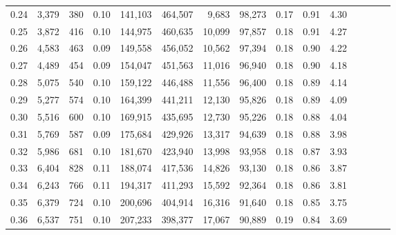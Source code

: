 \begin{tabular}{rrrcrrrrrrrrrrr}
0.24 &   3,379 &     380 &                                       0.10 &  141,103 &  464,507 &    9,683 &   98,273 &  0.17 &  0.91 &                         4.30 \\
0.25 &   3,872 &     416 &                                       0.10 &  144,975 &  460,635 &   10,099 &   97,857 &  0.18 &  0.91 &                         4.27 \\
0.26 &   4,583 &     463 &                                       0.09 &  149,558 &  456,052 &   10,562 &   97,394 &  0.18 &  0.90 &                         4.22 \\
0.27 &   4,489 &     454 &                                       0.09 &  154,047 &  451,563 &   11,016 &   96,940 &  0.18 &  0.90 &                         4.18 \\
0.28 &   5,075 &     540 &                                       0.10 &  159,122 &  446,488 &   11,556 &   96,400 &  0.18 &  0.89 &                         4.14 \\
0.29 &   5,277 &     574 &                                       0.10 &  164,399 &  441,211 &   12,130 &   95,826 &  0.18 &  0.89 &                         4.09 \\
0.30 &   5,516 &     600 &                                       0.10 &  169,915 &  435,695 &   12,730 &   95,226 &  0.18 &  0.88 &                         4.04 \\
0.31 &   5,769 &     587 &                                       0.09 &  175,684 &  429,926 &   13,317 &   94,639 &  0.18 &  0.88 &                         3.98 \\
0.32 &   5,986 &     681 &                                       0.10 &  181,670 &  423,940 &   13,998 &   93,958 &  0.18 &  0.87 &                         3.93 \\
0.33 &   6,404 &     828 &                                       0.11 &  188,074 &  417,536 &   14,826 &   93,130 &  0.18 &  0.86 &                         3.87 \\
0.34 &   6,243 &     766 &                                       0.11 &  194,317 &  411,293 &   15,592 &   92,364 &  0.18 &  0.86 &                         3.81 \\
0.35 &   6,379 &     724 &                                       0.10 &  200,696 &  404,914 &   16,316 &   91,640 &  0.18 &  0.85 &                         3.75 \\
0.36 &   6,537 &     751 &                                       0.10 &  207,233 &  398,377 &   17,067 &   90,889 &  0.19 &  0.84 &                         3.69 \\

\end{tabular}
